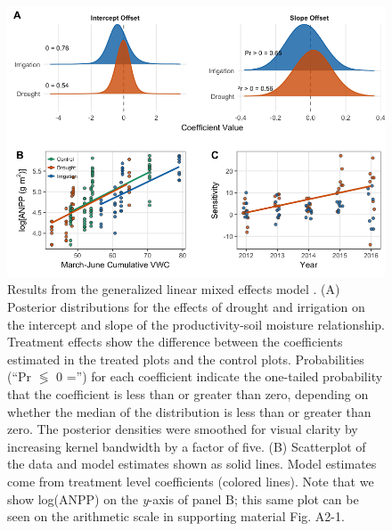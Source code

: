 \documentclass[fleqn,10pt,lineno]{wlpeerj} %
\begin{document}
\newpage{}

\begin{figure}[!ht]
  \centering
      \includegraphics[width=5in]{../figures/glmm_main_results.png}
  \caption{Results from the generalized linear mixed effects model . (A) Posterior distributions for the effects of drought and irrigation on the intercept and slope of the productivity-soil moisture relationship. Treatment effects show the difference between the coefficients estimated in the treated plots and the control plots. Probabilities (``Pr $\lessgtr$ 0 ='') for each coefficient indicate the one-tailed probability that the coefficient is less than or greater than zero, depending on whether the median of the distribution is less than or greater than zero. The posterior densities were smoothed for visual clarity by increasing kernel bandwidth by a factor of five. (B) Scatterplot of the data and model estimates shown as solid lines. Model estimates come from treatment level coefficients (colored lines). Note that we show log(ANPP) on the \emph{y}-axis of panel B; this same plot can be seen on the arithmetic scale in supporting material Fig. A2-1. }
\end{figure}

\newpage{}
\end{document}
